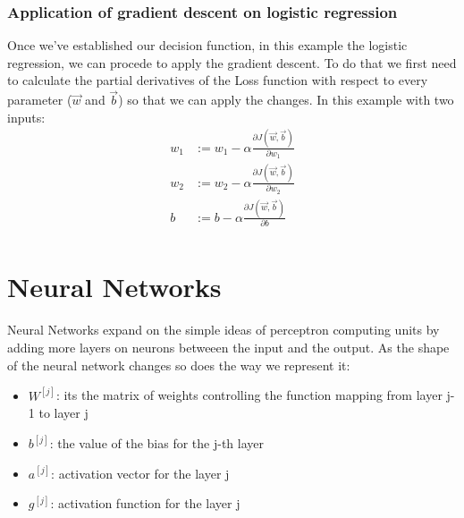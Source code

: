 \documentclass{article}
\begin{document}
\subsubsection{Application of gradient descent on logistic regression}
Once we've established our decision function, in this example the logistic regression, we can procede to apply the gradient descent. To do that we first need to calculate the partial derivatives of the Loss function with respect to every parameter ($\vec{w}$ and $\vec{b}$) so that we can apply the changes. In this example with two inputs:
\begin{align*}
    w_1 &:= w_1 - \alpha \frac{\partial J(\vec{w},\vec{b})}{\partial w_1}\\
    w_2 &:= w_2 - \alpha \frac{\partial J(\vec{w},\vec{b})}{\partial w_2}\\
    b &:= b - \alpha \frac{\partial J(\vec{w},\vec{b})}{\partial b}\\
\end{align*}

\section{Neural Networks}
Neural Networks expand on the simple ideas of perceptron computing units by adding more layers on neurons betweeen the input and the output. As the shape of the neural network changes so does the way we represent it:
\begin{itemize}
    \item $W^{[j]}$: its the matrix of weights controlling the function mapping from layer j-1 to layer j
    \item $b^{[j]}$: the value of the bias for the j-th layer
    \item $a^{[j]}$: activation vector for the layer j
    \item $g^{[j]}$: activation function for the layer j
\end{itemize}
\end{document}
